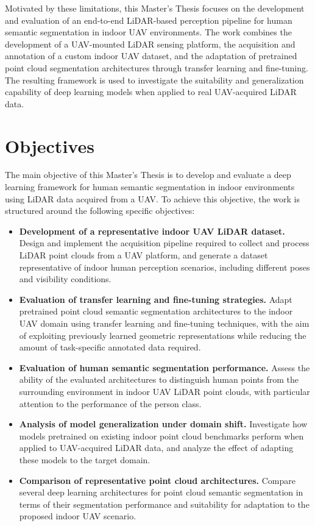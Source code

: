 Motivated by these limitations, this Master's Thesis focuses on the development and evaluation of an end-to-end LiDAR-based perception pipeline for human semantic segmentation in indoor UAV environments. The work combines the development of a UAV-mounted LiDAR sensing platform, the acquisition and annotation of a custom indoor UAV dataset, and the adaptation of pretrained point cloud segmentation architectures through transfer learning and fine-tuning. The resulting framework is used to investigate the suitability and generalization capability of deep learning models when applied to real UAV-acquired LiDAR data.

\section{Objectives}

The main objective of this Master's Thesis is to develop and evaluate a deep learning framework for human semantic segmentation in indoor environments using LiDAR data acquired from a UAV. To achieve this objective, the work is structured around the following specific objectives:

\begin{itemize}
\item \textbf{Development of a representative indoor UAV LiDAR dataset.}
Design and implement the acquisition pipeline required to collect and process LiDAR point clouds from a UAV platform, and generate a dataset representative of indoor human perception scenarios, including different poses and visibility conditions.

\item \textbf{Evaluation of transfer learning and fine-tuning strategies.}
Adapt pretrained point cloud semantic segmentation architectures to the indoor UAV domain using transfer learning and fine-tuning techniques, with the aim of exploiting previously learned geometric representations while reducing the amount of task-specific annotated data required.

\item \textbf{Evaluation of human semantic segmentation performance.}
Assess the ability of the evaluated architectures to distinguish human points from the surrounding environment in indoor UAV LiDAR point clouds, with particular attention to the performance of the person class.

\item \textbf{Analysis of model generalization under domain shift.}
Investigate how models pretrained on existing indoor point cloud benchmarks perform when applied to UAV-acquired LiDAR data, and analyze the effect of adapting these models to the target domain.

\item \textbf{Comparison of representative point cloud architectures.}
Compare several deep learning architectures for point cloud semantic segmentation in terms of their segmentation performance and suitability for adaptation to the proposed indoor UAV scenario.

\end{itemize}

